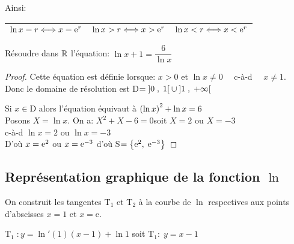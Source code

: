 Ainsi:


\begin{tabularx}{\textwidth}{|X|X|X|}
\hline
$ \ln x = r  \Longleftrightarrow x = \mathrm{e}^{r} $&
$ \ln x  > r \Longleftrightarrow x >\mathrm{e}^{r} $&
$ \ln x  < r\Longleftrightarrow x <   \mathrm{e}^{r} $\\
\hline
\end{tabularx}

\begin{exercice}

Résoudre dans $ \mathbb{R} $  l'équation:\; $ \ln x+1=\dfrac{6}{\ln x} $
\end{exercice}
\begin{proof}
Cette équation est définie lorsque:\; $ x>  0$\;  et\;  $\ln x \neq 0 \quad$ \; c-à-d \; $\quad x\neq 1. $ \\

 Donc le domaine de résolution est  \;D$ =\left]0 \;,\; 1\right[ \cup \left]1 \;,\; +\infty\right[ $

Si $ x \in $D alors  l'équation équivaut à  $ \left(\ln x\right)^{2}+ \ln x= 6 $\\

Posons \quad $  X= \ln x $.\; On a:\;  $ X^{2}+X-6=0$\quad  soit \;  $X=2 $ \;ou \; $X=-3 $\\

c-à-d \;  $ \ln x=2 $\; ou \; $ \ln x=-3 $\\

D'où\; $x=\mathrm{e}^{2} $   \; ou \; $x= \mathrm{e}^{-3} $ \;  d'où \; S$ =\left\{\mathrm{e}^{2},\;\mathrm{e}^{-3} \right\} $

\end{proof}

\subsection*{Représentation graphique de la fonction $ \ln $}
On construit les tangentes  T$ _{1} $   et T$ _{2} $ à la courbe de $ \ln $   respectives  aux points  d'abscisses $ x=1$ et $x= \mathrm{e} $.

 T$ _{1} \;: y= \ln'(1)(x-1) +\ln1$ \; soit \; T$ _{1}:\;y=x-1 $ 
 
